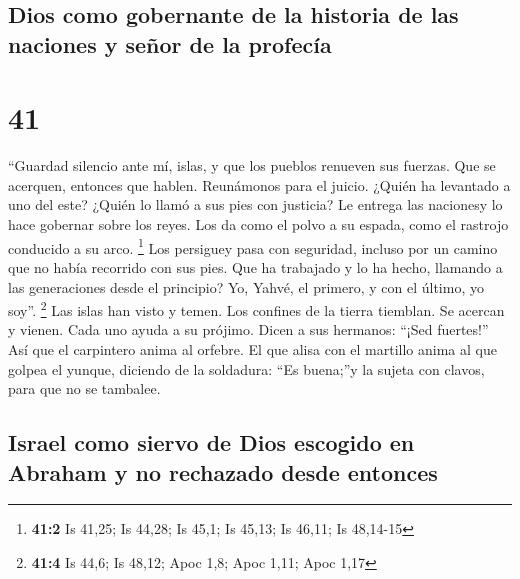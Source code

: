 \hypertarget{dios-como-gobernante-de-la-historia-de-las-naciones-y-seuxf1or-de-la-profecuxeda}{%
\subsection{Dios como gobernante de la historia de las naciones y señor
de la
profecía}\label{dios-como-gobernante-de-la-historia-de-las-naciones-y-seuxf1or-de-la-profecuxeda}}

\hypertarget{section-40}{%
\section{41}\label{section-40}}

 ``Guardad silencio ante mí, islas, y que los pueblos
renueven sus fuerzas. Que se acerquen, entonces que hablen. Reunámonos
para el juicio.  ¿Quién ha levantado a uno del este?
¿Quién lo llamó a sus pies con justicia? Le entrega las nacionesy lo
hace gobernar sobre los reyes. Los da como el polvo a su espada, como el
rastrojo conducido a su arco. \footnote{\textbf{41:2} Is 41,25; Is
  44,28; Is 45,1; Is 45,13; Is 46,11; Is 48,14-15}  Los
persiguey pasa con seguridad, incluso por un camino que no había
recorrido con sus pies.  Que ha trabajado y lo ha hecho,
llamando a las generaciones desde el principio? Yo, Yahvé, el primero, y
con el último, yo soy''. \footnote{\textbf{41:4} Is 44,6; Is 48,12; Apoc
  1,8; Apoc 1,11; Apoc 1,17}  Las islas han visto y temen.
Los confines de la tierra tiemblan. Se acercan y vienen. 
Cada uno ayuda a su prójimo. Dicen a sus hermanos: ``¡Sed fuertes!''
 Así que el carpintero anima al orfebre. El que alisa con
el martillo anima al que golpea el yunque, diciendo de la soldadura:
``Es buena;''y la sujeta con clavos, para que no se tambalee.

\hypertarget{israel-como-siervo-de-dios-escogido-en-abraham-y-no-rechazado-desde-entonces}{%
\subsection{Israel como siervo de Dios escogido en Abraham y no
rechazado desde
entonces}\label{israel-como-siervo-de-dios-escogido-en-abraham-y-no-rechazado-desde-entonces}}


